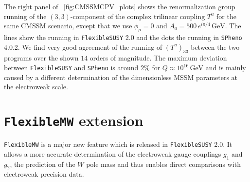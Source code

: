 \documentclass[final,3p,11pt,pdflatex]{elsarticle}
\makeatletter
\newcommand{\spheno}{\texttt{SPheno}\@\xspace}
\newcommand{\fs}{\texttt{FlexibleSUSY}\@\xspace}
\newcommand{\fstwo}{\fs 2.0\@\xspace}
\newcommand{\fmw}{\texttt{FlexibleMW}\@\xspace}
\newcommand{\unit}[1]{\,\text{#1}}      %
\newcommand{\figref}[1]{\figurename~\ref{#1}}
\newcommand{\azero}{\ensuremath{A_0}\xspace}
\makeatother
\begin{document}
The right panel of \figref{fig:CMSSMCPV_plots} shows the
renormalization group running of the $(3,3)$-component of the complex
trilinear coupling $T^u$ for the same CMSSM scenario, except that we
use $\phi_\mu = 0$ and $\azero = 500\, e^{i \pi/4} \unit{GeV}$.  The
lines show the running in \fstwo and the dots the
running in \spheno 4.0.2.  We find very good agreement of
the running of $(T^u)_{33}$ between the two programs over the shown
$14$ orders of magnitude. The maximum deviation between \fs and
\spheno is around $2\%$ for $Q \approx 10^{16} \unit{GeV}$ and is
mainly caused by a different determination of the
dimensionless MSSM parameters at the electroweak scale.

\section{\fmw extension}
\label{sec:fmw}
\fmw is a major new feature which is released in \fstwo.
It allows a more accurate determination of the electroweak gauge
couplings $g_1$ and $g_2$, the prediction of the $W$ pole mass and thus
enables direct comparisons with electroweak precision data.
\end{document}
